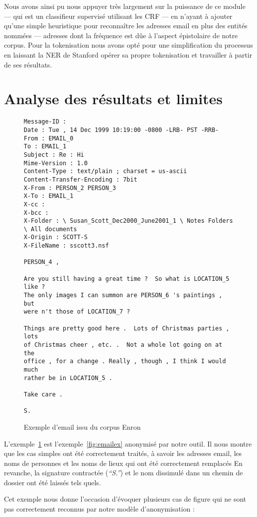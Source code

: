 \documentclass[11pt]{article}
\begin{document}
Nous avons ainsi pu nous appuyer très largement sur la puissance de ce module
--- qui est un classifieur supervisé utilisant les CRF ---
en n'ayant à ajouter qu'une simple heuristique pour reconnaître les adresses
email en plus des entités nommées --- adresses dont la fréquence est dûe à
l'aspect épistolaire de notre corpus. Pour la tokenisation nous avons opté pour
une simplification du processus en laissant la NER de Stanford opérer sa propre
tokenisation et travailler à partir de ses résultats.

\section{Analyse des résultats et limites}

\begin{figure}[H]
\begin{verbatim}
Message-ID :
Date : Tue , 14 Dec 1999 10:19:00 -0800 -LRB- PST -RRB-
From : EMAIL_0
To : EMAIL_1
Subject : Re : Hi
Mime-Version : 1.0
Content-Type : text/plain ; charset = us-ascii
Content-Transfer-Encoding : 7bit
X-From : PERSON_2 PERSON_3
X-To : EMAIL_1
X-cc :
X-bcc :
X-Folder : \ Susan_Scott_Dec2000_June2001_1 \ Notes Folders \ All documents
X-Origin : SCOTT-S
X-FileName : sscott3.nsf

PERSON_4 ,

Are you still having a great time ?  So what is LOCATION_5 like ?
The only images I can summon are PERSON_6 's paintings , but
were n't those of LOCATION_7 ?

Things are pretty good here .  Lots of Christmas parties , lots
of Christmas cheer , etc. .  Not a whole lot going on at the
office , for a change . Really , though , I think I would much
rather be in LOCATION_5 .

Take care .

S.
\end{verbatim}
\caption{Exemple d'email issu du corpus Enron}
\label{fig:emailanon}
\end{figure}

L'exemple~\ref{fig:emailanon} est l'exemple~\ref{fig:emailex} anonymisé
par notre outil. Il nous montre que les cas simples ont été correctement
traités, à savoir les adresses email, les noms de personnes et les noms
de lieux qui ont été correctement remplacés En revanche, la signature contractée
(\textit{``S.''}) et le nom dissimulé dans un chemin de dossier ont été laissés
tels quels.

Cet exemple nous donne l'occasion d'évoquer plusieurs cas de figure qui ne sont
pas correctement reconnus par notre modèle d'anonymisation :
\end{document}
